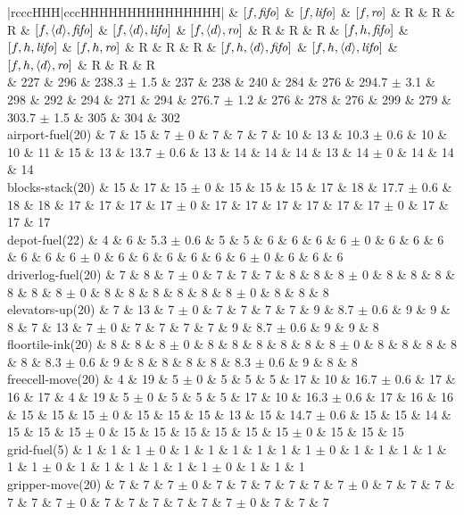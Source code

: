 \begin{center}
\begin{tabular}{|rcccHHH|cccHHHHHHHHHHHHHHH|}
 & $[f,{\text{\textit{fifo}}}]$ & $[f,{\text{\textit{lifo}}}]$ & $[f,{\text{\textit{ro}}}]$ & R & R & R & $[f,{\left<d\right>},{\text{\textit{fifo}}}]$ & $[f,{\left<d\right>},{\text{\textit{lifo}}}]$ & $[f,{\left<d\right>},{\text{\textit{ro}}}]$ & R & R & R & $[f,h,{\text{\textit{fifo}}}]$ & $[f,h,{\text{\textit{lifo}}}]$ & $[f,h,{\text{\textit{ro}}}]$ & R & R & R & $[f,h,{\left<d\right>},{\text{\textit{fifo}}}]$ & $[f,h,{\left<d\right>},{\text{\textit{lifo}}}]$ & $[f,h,{\left<d\right>},{\text{\textit{ro}}}]$ & R & R & R\\
\hline
 & 227 & 296 & 238.3 $\pm$ 1.5 & 237 & 238 & 240 & 284 & 276 & 294.7 $\pm$ 3.1 & 298 & 292 & 294 & 271 & 294 & 276.7 $\pm$ 1.2 & 276 & 278 & 276 & 299 & 279 & 303.7 $\pm$ 1.5 & 305 & 304 & 302\\
\hline
airport-fuel(20) & 7 & 15 & 7 $\pm$ 0 & 7 & 7 & 7 & 10 & 13 & 10.3 $\pm$ 0.6 & 10 & 10 & 11 & 15 & 13 & 13.7 $\pm$ 0.6 & 13 & 14 & 14 & 14 & 13 & 14 $\pm$ 0 & 14 & 14 & 14\\
blocks-stack(20) & 15 & 17 & 15 $\pm$ 0 & 15 & 15 & 15 & 17 & 18 & 17.7 $\pm$ 0.6 & 18 & 18 & 17 & 17 & 17 & 17 $\pm$ 0 & 17 & 17 & 17 & 17 & 17 & 17 $\pm$ 0 & 17 & 17 & 17\\
depot-fuel(22) & 4 & 6 & 5.3 $\pm$ 0.6 & 5 & 5 & 6 & 6 & 6 & 6 $\pm$ 0 & 6 & 6 & 6 & 6 & 6 & 6 $\pm$ 0 & 6 & 6 & 6 & 6 & 6 & 6 $\pm$ 0 & 6 & 6 & 6\\
driverlog-fuel(20) & 7 & 8 & 7 $\pm$ 0 & 7 & 7 & 7 & 8 & 8 & 8 $\pm$ 0 & 8 & 8 & 8 & 8 & 8 & 8 $\pm$ 0 & 8 & 8 & 8 & 8 & 8 & 8 $\pm$ 0 & 8 & 8 & 8\\
elevators-up(20) & 7 & 13 & 7 $\pm$ 0 & 7 & 7 & 7 & 7 & 9 & 8.7 $\pm$ 0.6 & 9 & 9 & 8 & 7 & 13 & 7 $\pm$ 0 & 7 & 7 & 7 & 7 & 9 & 8.7 $\pm$ 0.6 & 9 & 9 & 8\\
floortile-ink(20) & 8 & 8 & 8 $\pm$ 0 & 8 & 8 & 8 & 8 & 8 & 8 $\pm$ 0 & 8 & 8 & 8 & 8 & 8 & 8.3 $\pm$ 0.6 & 9 & 8 & 8 & 8 & 8 & 8.3 $\pm$ 0.6 & 9 & 8 & 8\\
freecell-move(20) & 4 & 19 & 5 $\pm$ 0 & 5 & 5 & 5 & 17 & 10 & 16.7 $\pm$ 0.6 & 17 & 16 & 17 & 4 & 19 & 5 $\pm$ 0 & 5 & 5 & 5 & 17 & 10 & 16.3 $\pm$ 0.6 & 17 & 16 & 16\\
 & 15 & 15 & 15 $\pm$ 0 & 15 & 15 & 15 & 13 & 15 & 14.7 $\pm$ 0.6 & 15 & 15 & 14 & 15 & 15 & 15 $\pm$ 0 & 15 & 15 & 15 & 15 & 15 & 15 $\pm$ 0 & 15 & 15 & 15\\
grid-fuel(5) & 1 & 1 & 1 $\pm$ 0 & 1 & 1 & 1 & 1 & 1 & 1 $\pm$ 0 & 1 & 1 & 1 & 1 & 1 & 1 $\pm$ 0 & 1 & 1 & 1 & 1 & 1 & 1 $\pm$ 0 & 1 & 1 & 1\\
gripper-move(20) & 7 & 7 & 7 $\pm$ 0 & 7 & 7 & 7 & 7 & 7 & 7 $\pm$ 0 & 7 & 7 & 7 & 7 & 7 & 7 $\pm$ 0 & 7 & 7 & 7 & 7 & 7 & 7 $\pm$ 0 & 7 & 7 & 7\\

\end{tabular}
\end{center}
